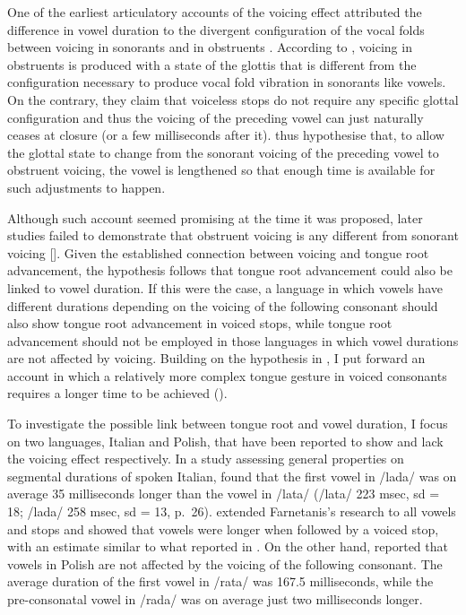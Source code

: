 \documentclass[authoryear, twocolumn]{elsarticle}
\begin{document}
One of the earliest articulatory accounts of the voicing effect
attributed the difference in vowel duration to the divergent
configuration of the vocal folds between voicing in sonorants and in
obstruents \citetext{\citealp{halle1967}; \citealp[reiterated
in][]{chomsky1968}}. According to \citet{halle1967}, voicing in
obstruents is produced with a state of the glottis that is different
from the configuration necessary to produce vocal fold vibration in
sonorants like vowels. On the contrary, they claim that voiceless stops
do not require any specific glottal configuration and thus the voicing
of the preceding vowel can just naturally ceases at closure (or a few
milliseconds after it). \citet{halle1967} thus hypothesise that, to
allow the glottal state to change from the sonorant voicing of the
preceding vowel to obstruent voicing, the vowel is lengthened so that
enough time is available for such adjustments to happen.

Although such account seemed promising at the time it was proposed,
later studies failed to demonstrate that obstruent voicing is any
different from sonorant voicing {[}{]}. Given the established connection
between voicing and tongue root advancement, the hypothesis follows that
tongue root advancement could also be linked to vowel duration. If this
were the case, a language in which vowels have different durations
depending on the voicing of the following consonant should also show
tongue root advancement in voiced stops, while tongue root advancement
should not be employed in those languages in which vowel durations are
not affected by voicing. Building on the hypothesis in
\citet{halle1967}, I put forward an account in which a relatively more
complex tongue gesture in voiced consonants requires a longer time to be
achieved ().

To investigate the possible link between tongue root and vowel duration,
I focus on two languages, Italian and Polish, that have been reported to
show and lack the voicing effect respectively. In a study assessing
general properties on segmental durations of spoken Italian,
\citet{farnetani1986} found that the first vowel in /lada/ was on
average 35 milliseconds longer than the vowel in /lata/ (/lata/ 223
msec, sd = 18; /lada/ 258 msec, sd = 13, p.~26). \citet{esposito2002}
extended Farnetanis's research to all vowels and stops and showed that
vowels were longer when followed by a voiced stop, with an estimate
similar to what reported in \citet{farnetani1986}. On the other hand,
\citet{keating1984} reported that vowels in Polish are not affected by
the voicing of the following consonant. The average duration of the
first vowel in /rata/ was 167.5 milliseconds, while the pre-consonatal
vowel in /rada/ was on average just two milliseconds longer.
\end{document}

